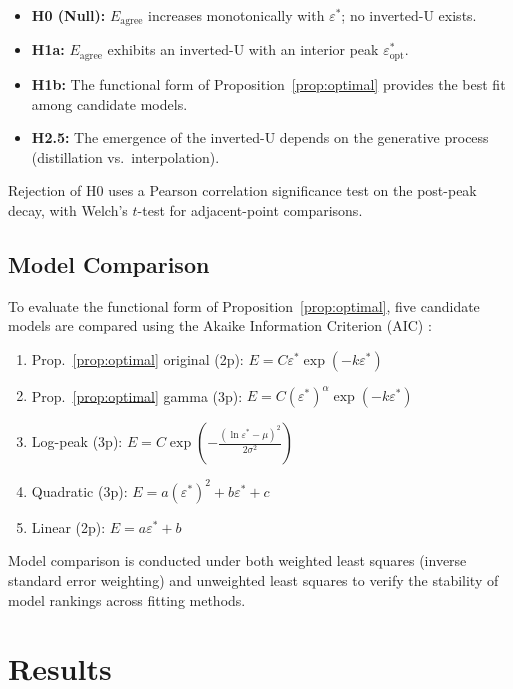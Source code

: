\documentclass[11pt,a4paper]{article}
\begin{document}
\begin{itemize}
\item \textbf{H0 (Null):} $E_\mathrm{agree}$ increases monotonically with $\varepsilon^*$;
  no inverted-U exists.
\item \textbf{H1a:} $E_\mathrm{agree}$ exhibits an inverted-U with an interior peak
  $\varepsilon^*_\mathrm{opt}$.
\item \textbf{H1b:} The functional form of Proposition~\ref{prop:optimal} provides the
  best fit among candidate models.
\item \textbf{H2.5:} The emergence of the inverted-U depends on the generative process
  (distillation vs.\ interpolation).
\end{itemize}

Rejection of H0 uses a Pearson correlation significance test on the post-peak decay, with
Welch's $t$-test for adjacent-point comparisons.

\subsection{Model Comparison}

To evaluate the functional form of Proposition~\ref{prop:optimal}, five candidate models are
compared using the Akaike Information Criterion (AIC) \cite{akaike1974}:

\begin{enumerate}
\item Prop.~\ref{prop:optimal} original (2p): $E = C\varepsilon^*\exp(-k\varepsilon^*)$
\item Prop.~\ref{prop:optimal} gamma (3p): $E = C(\varepsilon^*)^\alpha\exp(-k\varepsilon^*)$
\item Log-peak (3p): $E = C\exp\!\left(-\frac{(\ln\varepsilon^* - \mu)^2}{2\sigma^2}\right)$
\item Quadratic (3p): $E = a(\varepsilon^*)^2 + b\varepsilon^* + c$
\item Linear (2p): $E = a\varepsilon^* + b$
\end{enumerate}

Model comparison is conducted under both weighted least squares (inverse standard error
weighting) and unweighted least squares to verify the stability of model rankings across
fitting methods.

\section{Results}
\end{document}
